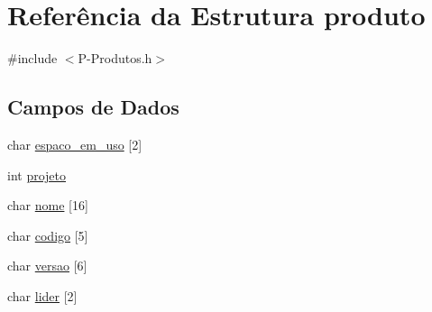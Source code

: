 \hypertarget{structproduto}{\section{Referência da Estrutura produto}
\label{structproduto}
}


{\ttfamily \#include $<$P-\/\-Produtos.\-h$>$}

\subsection*{Campos de Dados}
\begin{DoxyCompactItemize}
\item 
char \hyperlink{structproduto_ac7e43414b526549a2b1e10ea21cf75de}{espaco\-\_\-em\-\_\-uso} \mbox{[}2\mbox{]}
\item 
int \hyperlink{structproduto_a9d906bed8fe7bf344c38918cc554a5fe}{projeto}
\item 
char \hyperlink{structproduto_a25aba59e5c950d7fdadfdb8b5f7f861d}{nome} \mbox{[}16\mbox{]}
\item 
char \hyperlink{structproduto_ad0c9d37982e1e28e99d46e4b61873b2b}{codigo} \mbox{[}5\mbox{]}
\item 
char \hyperlink{structproduto_a376e2786bc5a3760798074dd795d03a3}{versao} \mbox{[}6\mbox{]}
\item 
char \hyperlink{structproduto_adfe3d53145a1dbc68bc34d864d25ba37}{lider} \mbox{[}2\mbox{]}
\end{DoxyCompactItemize}


